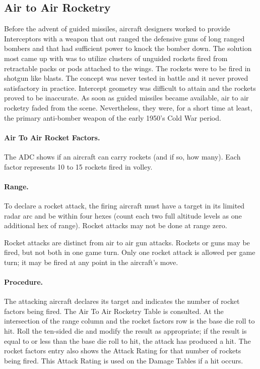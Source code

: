 
\advancedrules

\subsection{Air to Air Rocketry}

Before the advent of guided missiles, aircraft designers worked to provide Interceptors with a weapon that out ranged the defensive guns of long ranged bombers and that had sufficient power to knock the bomber down. The solution most came up with was to utilize clusters of unguided rockets fired from retractable packs or pods attached to the wings. The rockets were to be fired in shotgun like blasts. The concept was never tested in battle and it never proved satisfactory in practice. Intercept geometry was difficult to attain and the rockets proved to be inaccurate. As soon as guided missiles became available, air to air rocketry faded from the scene. Nevertheless, they were, for a short time at least, the primary anti-bomber weapon of the early 1950's Cold War period.

\paragraph{Air To Air Rocket Factors.} The ADC shows if an aircraft can carry rockets (and if so, how many). Each factor represents 10 to 15 rockets fired in volley.

\paragraph{Range.} To declare a rocket attack, the firing aircraft must have a target in its limited radar arc and be within four hexes (count each two full altitude levels as one additional hex of range). Rocket attacks may not be done at range zero.

Rocket attacks are distinct from air to air gun attacks. Rockets or guns may be fired, but not both in one game turn. Only one rocket attack is allowed per game turn; it may be fired at any point in the aircraft's move.

\paragraph{Procedure.} The attacking aircraft declares its target and indicates the number of rocket factors being fired. The Air To Air Rocketry Table is consulted. At the intersection of the range column and the rocket factors row is the base die roll to hit. Roll the ten-sided die and modify the result as appropriate; if the result is equal to or less than the base die roll to hit, the attack has produced a hit. The rocket factors entry also shows the Attack Rating for that number of rockets being fired. This Attack Rating is used on the Damage Tables if a hit occurs.

